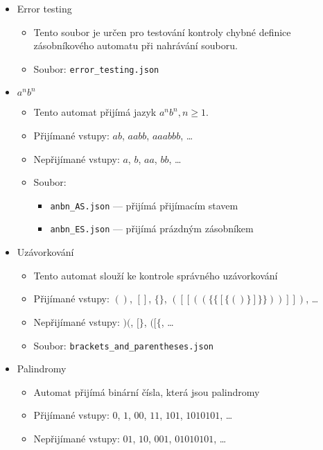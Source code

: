 \begin{itemize}
    \item Error testing
        \begin{itemize}
            \item Tento soubor je určen pro testování kontroly chybné definice zásobníkového automatu při nahrávání souboru.
            \item Soubor: \texttt{error\_testing.json}
        \end{itemize}
    \item $a^{n}b^{n}$
        \begin{itemize}
            \item Tento automat přijímá jazyk $a^nb^n, n \ge 1$.
            \item Přijímané vstupy: $ab$, $aabb$, $aaabbb$, \ldots
            \item Nepřijímané vstupy: $a$, $b$, $aa$, $bb$, \ldots
            \item Soubor:
                \begin{itemize}
                    \item \texttt{anbn\_AS.json} --- přijímá přijímacím stavem
                    \item \texttt{anbn\_ES.json} --- přijímá prázdným zásobníkem
                \end{itemize}
        \end{itemize}
        \newpage
    \item Uzávorkování
        \begin{itemize}
            \item Tento automat slouží ke kontrole správného uzávorkování
            \item Přijímané vstupy: $()$, $[]$, $\{\}$, $([[((\{\{[\{()\}]\}\}))]])$, \ldots
            \item Nepřijímané vstupy: $)($, $[\}$, $([\{$, \ldots
            \item Soubor: \texttt{brackets\_and\_parentheses.json}
        \end{itemize}
    \item Palindromy
        \begin{itemize}
            \item Automat přijímá binární čísla, která jsou palindromy
            \item Přijímané vstupy: $0$, $1$, $00$, $11$, $101$, $1010101$, \ldots
            \item Nepřijímané vstupy: $01$, $10$, $001$, $01010101$, \ldots

\end{itemize}
\end{itemize}
